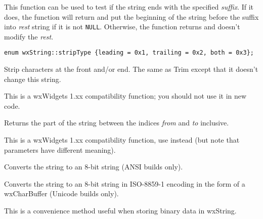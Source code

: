 \label{wxstringendswith}


This function can be used to test if the string ends with the specified 
{\it suffix}. If it does, the function will return \true and put the
beginning of the string before the suffix into {\it rest} string if it is not 
{\tt NULL}. Otherwise, the function returns \false and doesn't
modify the {\it rest}.


\label{wxstringstrip}

\begin{verbatim}
enum wxString::stripType {leading = 0x1, trailing = 0x2, both = 0x3};
\end{verbatim}


Strip characters at the front and/or end. The same as Trim except that it
doesn't change this string.

This is a wxWidgets 1.xx compatibility function; you should not use it in new code.


\label{wxstringsubstring}


Returns the part of the string between the indices {\it from} and {\it to}
inclusive.

This is a wxWidgets 1.xx compatibility function, use 
instead (but note that parameters have different meaning).


\label{wxstringto8bitdata}


Converts the string to an 8-bit string (ANSI builds only).


Converts the string to an 8-bit string in ISO-8859-1 encoding in the form of
a wxCharBuffer (Unicode builds only).

This is a convenience method useful when storing binary data in wxString.





